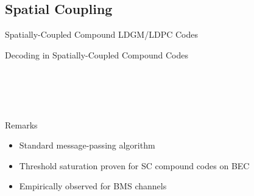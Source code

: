 \documentclass[10pt]{beamer}
\def\side_information_path{../compound-codes/isit14/slides/Figures}
\newlength\tikzwidth
\newlength\tikzheight
\begin{document}
\subsection{Spatial Coupling}
\begin{frame}{Spatially-Coupled Compound LDGM/LDPC Codes}
  \begin{center}
    \scalebox{0.8}{}
  \end{center}
\end{frame}

\begin{frame}{Decoding in Spatially-Coupled Compound Codes}
  \begin{columns}
    \setlength\tikzheight{5cm}
    \setlength\tikzwidth{6cm}
    \scalebox{0.5}{}

    \scalebox{0.5}{}\\ \vspace{0.3cm}
    \scalebox{0.5}{}\\ \vspace{0.3cm}
    \scalebox{0.5}{}
  \end{columns}
  \begin{block}{Remarks}
    \begin{itemize}
    \item Standard message-passing algorithm
    \item Threshold saturation proven for SC compound codes on BEC
    \item Empirically observed for BMS channels
    \end{itemize}
  \end{block}
\end{frame}
\end{document}
